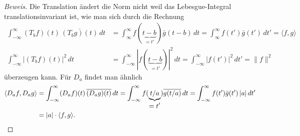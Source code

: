 \begin{proof}[Beweis]
Die Translation ändert die Norm nicht weil das Lebesgue-Integral 
translationsinvariant ist, wie man sich durch die Rechnung
\begin{align*}
\int_{-\infty}^\infty (T_bf)(t)\,\overline{(T_bg)(t)}\,dt
&=
\int_{\infty}^\infty f(\underbrace{t-b}_{\displaystyle=t'})\bar{g}(t-b)\,dt
=
\int_{\infty}^\infty f(t')\bar{g}(t')\,dt'
=
\langle f,g\rangle
\\
\int_{-\infty}^\infty |(T_bf)(t)|^2\,dt
&=
\int_{-\infty}^\infty |f(\underbrace{t-b}_{\displaystyle=t'})|^2\,dt
=
\int_{-\infty}^\infty |f(t')|^2\,dt'
=
\|f\|^2
\end{align*}
überzeugen kann.
Für $D_a$ findet man ähnlich
\begin{align*}
\langle D_af,D_ag\rangle
&=
\int_{-\infty}^\infty (D_af)(t)\,\overline{(D_ag)(t)}\,dt
=
\int_{-\infty}^\infty
f(\underbrace{t/a}_{\displaystyle=t'})
\overline{g(t/a)}
\,dt
=
\int_{-\infty}^\infty f(t')\bar{g}(t')\,|a|\,dt'
\\
&=
|a|\cdot \langle f,g\rangle.
\qedhere
\end{align*}
\end{proof}








